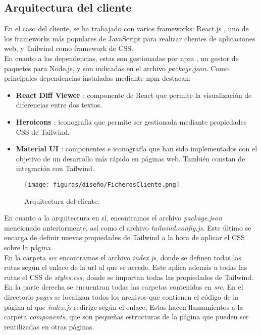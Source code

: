 \subsection{Arquitectura del cliente}

En el caso del cliente, se ha trabajado con varios frameworks: React.js \cite{react}, uno de los frameworks más populares de JavaScript para realizar clientes de aplicaciones web, y Tailwind \cite{tailwind} como framework de CSS.
\\

En cuanto a las dependencias, estas son gestionadas por npm \cite{npm}, un gestor de paquetes para Node.js, y son indicadas en el archivo {\it package.json}. Como principales dependencias instaladas mediante npm destacan:
\begin{itemize}
    \item {\bf React Diff Viewer \cite{reactdiffviewer}}: componente de React que permite la visualización de diferencias entre dos textos.
    \item {\bf Heroicons \cite{heroicons}}: iconografía que permite ser gestionada mediante propiedades CSS de Tailwind.
    \item {\bf Material UI \cite{materialui}}: componentes e iconografía que han sido implementados con el objetivo de un desarrollo más rápido en páginas web. También constan de integración con Tailwind.
\end{itemize}

\begin{figure}[H]
\centerline{\texttt{[image: figuras/diseño/FicherosCliente.png]}}
\caption{Arquitectura del cliente.}
\label{enlaceArquitecturaCliente}
\end{figure}

En cuanto a la arquitectura en sí, encontramos el archivo {\it package.json} mencionado anteriormente, así como el archivo {\it tailwind.config.js}. Este último se encarga de definir nuevas propiedades de Tailwind a la hora de aplicar el CSS sobre la página.
\\

En la carpeta {\it src} encontramos el archivo {\it index.js}, donde se definen todas las rutas según el enlace de la url al que se accede. Este aplica además a todas las rutas el CSS de {\it styles.css}, donde se importan todas las propiedades de Tailwind.
\\

En la parte derecha se encuentran todas las carpetas contenidas en {\it src}. En el directorio {\it pages} se localizan todos los archivos que contienen el código de la página al que {\it index.js} redirige según el enlace. Estas hacen llamamientos a la carpeta {\it components}, que son pequeñas estructuras de la página que pueden ser reutilizadas en otras páginas.
\\

